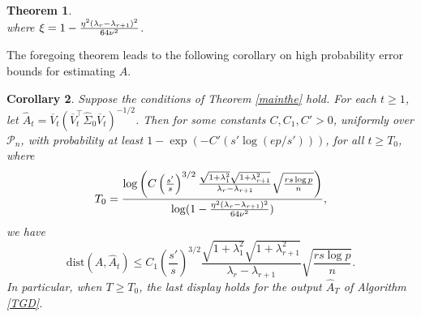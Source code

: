 \documentclass[11pt]{article}
\newcommand{\nb}[1]{\textcolor{orange}{\texttt{[#1]}}}
\newcommand{\gsc}[1]{\textcolor{blue}{\texttt{[#1]}}}
\newcommand{\rev}[1]{\textcolor{black}{#1}}
\newcommand{\bA}{\widehat{A}}
\newcommand{\hs}{s'}
\newcommand{\festimate}{\widehat{A}_t}
\newcommand{\gd}{\overline{V}}
\newcommand{\so}{\widehat{\Sigma}_0}
\newcommand{\0}{{\mathbf{0}}}
\newtheorem{theorem}{Theorem}[section]
\newtheorem{corollary}[theorem]{Corollary}
\begin{document}
\begin{theorem}
\begin{equation}
\end{equation}
where $\xi=1-\frac{\eta^2(\lambda_r-\lambda_{r+1})^2}{64\rev{\nu^2}}$.
%
%
\end{theorem}

The foregoing theorem leads to the following corollary on high probability error bounds for estimating $A$.

\begin{corollary}
      \label{cor: normalized estimate}
Suppose the conditions of Theorem \ref{mainthe} hold.
For each $t \geq 1$,
let $\festimate=\gd_t(\gd_t^\top\so\gd_t)^{-1/2}$.
Then for some constants $C,C_1, C'>0$, 
uniformly over $\mathcal{P}_n$, with probability at least $1-\exp(-C'(s'\log(ep/s')))$,
for all $t\geq T_0$, where \begin{equation}\label{iteration}
T_0=\frac{\log\left(C\left(\frac{s'}{s}\right)^{3/2}\frac{\sqrt{1+\lambda_1^2}\sqrt{{1+\lambda_{r+1}^2}}}{\lambda_r-\lambda_{r+1}}\sqrt{\frac{rs\log p}{n}}\right)}{\log(1-\frac{\eta^2(\lambda_r-\lambda_{r+1})^2}{64\rev{\nu^2}})},
\end{equation} 
we have
\begin{equation*}
\mathrm{dist}(A,\festimate)\leq C_1\left(\frac{s'}{s}\right)^{3/2}\frac{\sqrt{1+\lambda_1^2}\sqrt{{1+\lambda_{r+1}^2}}}{\lambda_r-\lambda_{r+1}}\sqrt{\frac{rs\log p}{n}}.
\end{equation*}
In particular, when $T \geq T_0$, the last display holds for the output $\widehat{A}_T$ of Algorithm \ref{TGD}.
\end{corollary}
\end{document}
